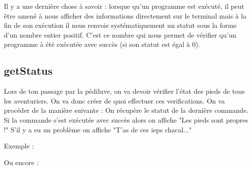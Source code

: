 \documentclass[a4paper, 12pt]{article}
\begin{document}
{    \vspace{0.6cm}
    
    \vspace{0.6cm}


    \vspace{2cm}
    Il y a une dernière chose à savoir : lorsque qu'un programme est exécuté, il peut être amené à nous afficher
    des informations directement sur le terminal mais à la fin de son exécution il nous renvoie systématiquement un statut
    sous la forme d'un nombre entier positif. C'est ce nombre qui nous permet de
    vérifier qu'un programme à été exécutée avec succès (si son statut est égal à 0).
    \vspace{4cm}

    \subsection{getStatus}

    Lors de ton passage par la pédiluve, on va devoir vérifier l'état des pieds de tous les
    aventuriers. On va donc créer de quoi effectuer ces verifications.
    \newline \newline
    On va procéder de la manière suivante :
    \newline \newline
    On récupère le statut de la dernière commande. Si la commande
    s'est exécutée avec succès alors on affiche "Les pieds sont propres !"
    S'il y a eu un problème on affiche "T'as de ces ieps chacal..."
    \newline \newline

    Exemple :


    Ou encore :

    
}
\end{document}
